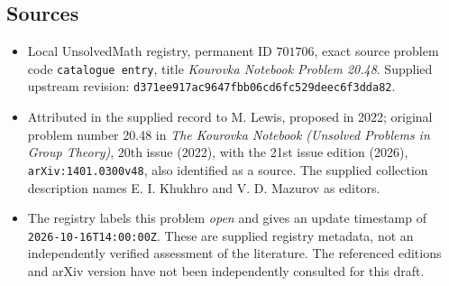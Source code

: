 \documentclass[11pt]{article}
\begin{document}
\subsection{Sources}
\begin{itemize}
\item Local UnsolvedMath registry, permanent ID \(701706\), exact source problem code \texttt{catalogue entry}, title \emph{Kourovka Notebook Problem 20.48}. Supplied upstream revision: \texttt{d371ee917ac9647fbb06cd6fc529deec6f3dda82}.
\item Attributed in the supplied record to M. Lewis, proposed in 2022; original problem number 20.48 in \emph{The Kourovka Notebook (Unsolved Problems in Group Theory)}, 20th issue (2022), with the 21st issue edition (2026), \texttt{arXiv:1401.0300v48}, also identified as a source. The supplied collection description names E. I. Khukhro and V. D. Mazurov as editors.
\item The registry labels this problem \emph{open} and gives an update timestamp of \texttt{2026-10-16T14:00:00Z}. These are supplied registry metadata, not an independently verified assessment of the literature. The referenced editions and arXiv version have not been independently consulted for this draft.
\end{itemize}
\end{document}

